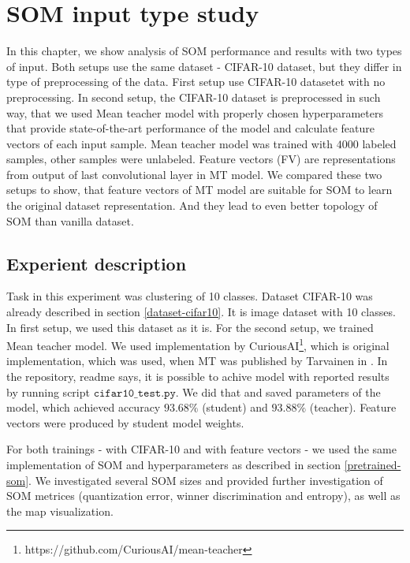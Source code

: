 \chapter{SOM input type study}

\label{chap:som-fv-cifar}

In this chapter, we show analysis of SOM performance and results with two types of input. Both setups use the same dataset - CIFAR-10 dataset, but they differ in type of preprocessing of the data. First setup use CIFAR-10 datasetet with no preprocessing. In second setup, the CIFAR-10 dataset is preprocessed in such way, that we used Mean teacher model with properly chosen hyperparameters that provide state-of-the-art performance of the model and calculate feature vectors of each input sample. Mean teacher model was trained with $4000$ labeled samples, other samples were unlabeled. Feature vectors (FV) are representations from output of last convolutional layer in MT model. We compared these two setups to show, that feature vectors of MT model are suitable for SOM to learn the original dataset representation. And they lead to even better topology of SOM than vanilla dataset.

\section{Experient description}
Task in this experiment was clustering of 10 classes. Dataset CIFAR-10 was already described in section \ref{dataset-cifar10}. It is image dataset with 10 classes. 
In first setup, we used this dataset as it is. For the second setup, we trained Mean teacher model. We used implementation by CuriousAI\footnote{https://github.com/CuriousAI/mean-teacher}, which is original implementation, which was used, when MT was published by Tarvainen in \cite{tarvainen}. In the repository, readme says, it is possible to achive model with reported results by running script $\texttt{cifar10\_test.py}$. We did that and saved parameters of the model, which achieved accuracy $93.68\%$ (student) and $93.88\%$ (teacher). Feature vectors were produced by student model weights. 

For both trainings - with CIFAR-10 and with feature vectors - we used the same implementation of SOM and hyperparameters as described in section \ref{pretrained-som}. We investigated several SOM sizes and provided further investigation of SOM metrices (quantization error, winner discrimination and entropy), as well as the map visualization.



